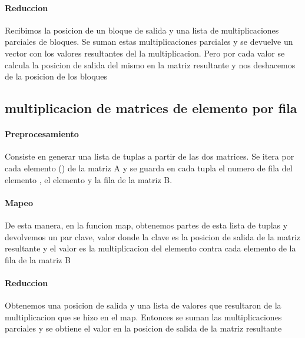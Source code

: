     \paragraph{Reduccion}

        Recibimos la posicion de un bloque de salida y una lista de
        multiplicaciones parciales de bloques. Se suman estas multiplicaciones
        parciales y se devuelve un vector con los valores resultantes del la
        multiplicacion. Pero por cada valor se calcula la posicion de salida del
        mismo en la matriz resultante y nos deshacemos de la posicion de los
        bloques

\subsection{multiplicacion de matrices de elemento por fila}

    \paragraph{Preprocesamiento}

        Consiste en generar una lista de tuplas a partir de las dos matrices.
        Se itera por cada elemento () de la matriz A y se guarda
        en cada tupla el numero de fila del elemento , el
        elemento  y la fila  de la matriz B.\\

    \paragraph{Mapeo}

        De esta manera, en la funcion map, obtenemos partes de esta lista de
        tuplas y devolvemos un par clave, valor donde la clave es la posicion
        de salida de la matriz resultante  y el valor es la
        multiplicacion del elemento  contra cada elemento de la
        fila  de la matriz B

    \paragraph{Reduccion}

        Obtenemos una posicion de salida y una lista de valores que resultaron
        de la multiplicacion que se hizo en el map. Entonces se suman las
        multiplicaciones parciales y se obtiene el valor en la posicion de salida
        de la matriz resultante

